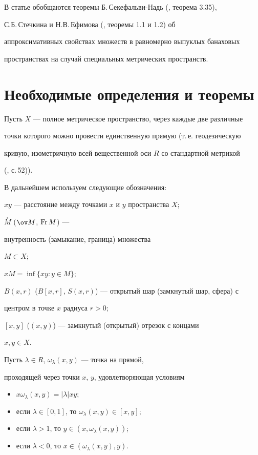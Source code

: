 В статье обобщаются теоремы Б.\,Секефальви-Надь (\cite{Bru}, теорема 3.35),


С.Б.\,Стечкина и Н.В.\,Ефимова (\cite{Vla}, теоремы 1.1 и 1.2) об


аппроксимативных свойствах множеств в равномерно выпуклых банаховых


пространствах на случай специальных метрических пространств.





\section{Необходимые определения и теоремы}





Пусть $X$ --- полное метрическое пространство, через каждые две различные


точки которого можно провести единственную прямую (т.\,е. геодезическую


кривую, изометричную всей вещественной оси $R$ со стандартной метрикой


(\cite{Sin}, с.\,52)).





В дальнейшем используем следующие обозначения:


$xy$ --- расстояние между точками $x$ и $y$ пространства $X$;


$\overset{\circ}{M}$ ($\ov M$, $\operatorname{Fr} M$) ---


внутренность (замыкание, граница) множества


$M\subset X$;


$xM = \inf\{xy : y\in M\}$;


$B(x,r)$ ($B[x,r]$, $S(x,r)$) --- открытый шар (замкнутый шар, сфера) с


центром в точке $x$ радиуса $r>0$;


$[x,y]$ ($(x,y)$) --- замкнутый (открытый) отрезок с концами


$x, y \in X$.


 


Пусть $\lambda \in R$, $\omega_{\lambda}(x,y)$ --- точка на прямой,


проходящей через точки $x$, $y$, удовлетворяющая условиям


\begin{itemize}


\item[а)] $x\omega_{\lambda}(x,y) = |\lambda|xy$;


\item[б)] если $\lambda \in [0,1]$, то $\omega_{\lambda}(x,y) \in [x,y]$;


\item[в)] если $\lambda > 1$, то $y \in (x,\omega_{\lambda}(x,y))$;


\item[г)] если $\lambda < 0$, то $x \in (\omega_{\lambda}(x,y),y)$.


\end{itemize}


